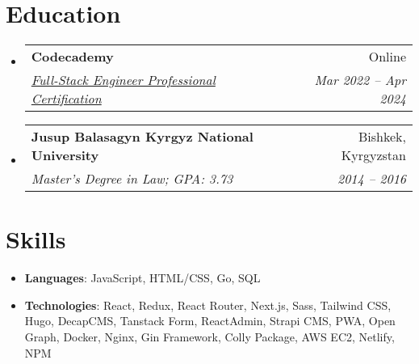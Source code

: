 \documentclass[letterpaper,11pt]{article}
\makeatletter
\newcommand{\resumeSubheading}[4]{
  \vspace{-1pt}\item
    \begin{tabular*}{0.97\textwidth}[t]{l@{\extracolsep{\fill}}r}
      \textbf{#1} & #2 \\
      \textit{\small#3} & \textit{\small #4} \\
    \end{tabular*}\vspace{-5pt}
}
\newcommand{\resumeSubHeadingListStart}{\begin{itemize}[leftmargin=*]}
\newcommand{\resumeSubHeadingListEnd}{\end{itemize}}
\makeatother
\begin{document}

\section{Education}
  \resumeSubHeadingListStart
    \resumeSubheading
      {Codecademy}{Online}
      {\href{https://www.codecademy.com/profiles/BeksultanAbdikaarov/certificates/ffd0f42cce1a44e9a0108b365047a0a6}{Full-Stack Engineer Professional Certification}}{Mar 2022 -- Apr 2024}
    \resumeSubheading
      {Jusup Balasagyn Kyrgyz National University}{Bishkek, Kyrgyzstan}
      {Master's Degree in Law; GPA: 3.73}{2014 -- 2016}
  \resumeSubHeadingListEnd

%
\section{Skills}
 \resumeSubHeadingListStart
   \item{
     \textbf{Languages}{: JavaScript, HTML/CSS, Go, SQL}
   }
   \item{
     \textbf{Technologies}{: React, Redux, React Router, Next.js, Sass, Tailwind CSS, Hugo, DecapCMS, Tanstack Form, ReactAdmin, Strapi CMS, PWA, Open Graph, Docker, Nginx, Gin Framework, Colly Package, AWS EC2, Netlify, NPM}
   }
 \resumeSubHeadingListEnd

\end{document}
